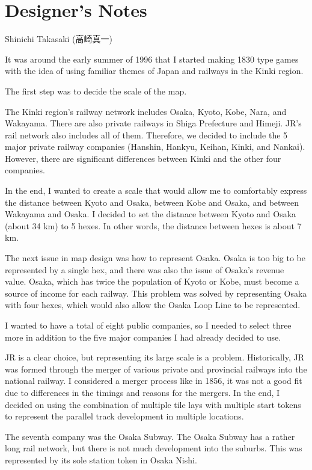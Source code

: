 \section{Designer's Notes}
{\large Shinichi Takasaki (高崎真一)}
\begin{multicols}{2}
It was around the early summer of 1996 that I started making 1830 type
games with the idea of ​​using familiar themes of Japan and railways in
the Kinki region.

The first step was to decide the scale of the map.

The Kinki region's railway network includes Osaka, Kyoto, Kobe, Nara,
and Wakayama. There are also private railways in Shiga Prefecture and
Himeji. JR's rail network also includes all of them. Therefore, we
decided to include the 5 major private railway companies (Hanshin,
Hankyu, Keihan, Kinki, and Nankai). However, there are significant
differences between Kinki and the other four companies.

In the end, I wanted to create a scale that would allow me to
comfortably express the distance between Kyoto and Osaka, between Kobe
and Osaka, and between Wakayama and Osaka. I decided to set the
distnace between Kyoto and Osaka (about 34 km) to 5 hexes. In other
words, the distance between hexes is about 7 km.

The next issue in map design was how to represent Osaka. Osaka is too
big to be represented by a single hex, and there was also the issue of
Osaka's revenue value. Osaka, which has twice the population of Kyoto
or Kobe, must become a source of income for each railway. This problem
was solved by representing Osaka with four hexes, which would also
allow the Osaka Loop Line to be represented.

I wanted to have a total of eight public companies, so I needed to
select three more in addition to the five major companies I had
already decided to use.

JR is a clear choice, but representing its large scale is a
problem. Historically, JR was formed through the merger of various
private and provincial railways into the national railway. I
considered a merger process like in 1856, it was not a good fit due to
differences in the timings and reasons for the mergers. In the end, I
decided on using the combination of multiple tile lays with multiple
start tokens to represent the parallel track development in multiple
locations.

The seventh company was the Osaka Subway. The Osaka Subway has a
rather long rail network, but there is not much development into the
suburbs. This was represented by its sole station token in Osaka Nishi.


\end{multicols}
